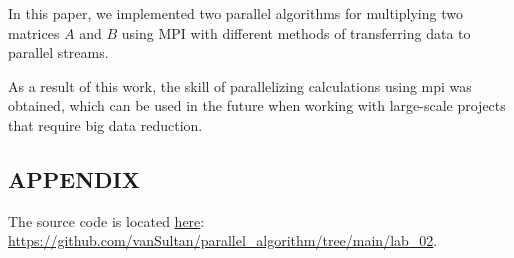 In this paper, we implemented two parallel algorithms for multiplying two matrices $A$ and $B$ using MPI with different methods of transferring data to parallel streams.

As a result of this work, the skill of parallelizing calculations using mpi was obtained, which can be used in the future when working with large-scale projects that require big data reduction.

\subsection{APPENDIX}\label{subsec:appendix}

The source code is located \href{https://github.com/vanSultan/parallel_algorithm/tree/main/lab_02}{here}: \url{https://github.com/vanSultan/parallel_algorithm/tree/main/lab_02}.
